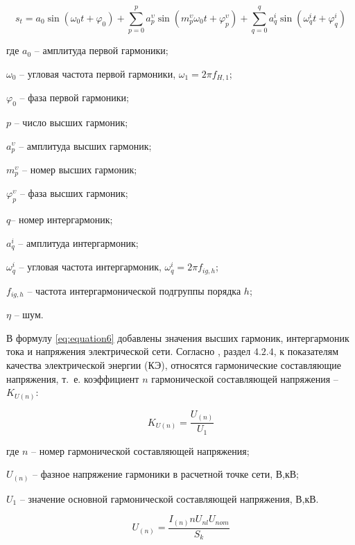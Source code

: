 \begin{equation}
	\label{eq:equation6}
		s_{t} = a_{0} \sin (\omega_{0} t + \varphi_{0}) + \displaystyle\sum_{p=0}^{p} a_p^{\upsilon} \sin (m_p^{\upsilon} \omega_{0} t + \varphi_p^{\upsilon}) + \displaystyle\sum_{q=0}^{q} a_q^i \sin  (\omega_q^i t + \varphi_q^{i})
\end{equation}

где $a_{0}$ – амплитуда первой гармоники;

$\omega_{0}$ – угловая частота первой гармоники, $\omega_{1} = 2 \pi f_{H,1}$;

$\varphi_{0}$ – фаза первой гармоники; 

$p$ – число высших гармоник;

$a_p^{\upsilon}$ – амплитуда высших гармоник;

$m_p^{\upsilon}$ – номер высших гармоник;

$\varphi_p^{\upsilon}$ – фаза высших гармоник;

$q$– номер интергармоник;

$a_q^i$ – амплитуда интергармоник;

$\omega_q^i$ – угловая частота интергармоник, $\omega_q^i=2\pi f_{ig,h}$; 

$f_{ig,h}$ – частота интергармонической подгруппы порядка $h$;

$\eta$ – шум.

В формулу \ref{eq:equation6} добавлены значения высших гармоник, интергармоник тока и напряжения электрической сети.
Согласно \cite{32144-2013}, раздел $4.2.4$, к показателям качества электрической энергии (КЭ), относятся гармонические составляющие напряжения, т.~е. коэффициент  $n$ гармонической составляющей напряжения – $K_{U(n)}$:

\begin{equation}
	\label{eq:equation7}
K_{U(n)} = \frac{U_{(n)}}{U_1}
\end{equation}

где $n$ – номер гармонической составляющей напряжения;
 
$U_{(n)}$ – фазное напряжение гармоники в расчетной точке сети, В,кВ;

$U_1$ – значение основной гармонической составляющей напряжения, В,кВ.

\begin{equation}
	\label{eq:equation8}
	U_(n) = \frac{I_{(n)} n U_{nl} U_{nom}}{S_k}
\end{equation}

